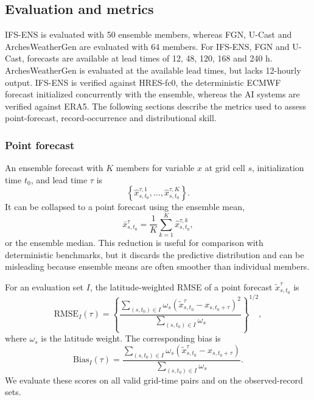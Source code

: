 \documentclass[11pt]{article}
\begin{document}
\subsection{Evaluation and metrics}

IFS-ENS is evaluated with 50 ensemble members, whereas FGN, U-Cast and ArchesWeatherGen are evaluated with 64 members. For IFS-ENS, FGN and U-Cast, forecasts are available at lead times of 12, 48, 120, 168 and 240 h. ArchesWeatherGen is evaluated at the available lead times, but lacks 12-hourly output. IFS-ENS is verified against HRES-fc0, the deterministic ECMWF forecast initialized concurrently with the ensemble, whereas the AI systems are verified against ERA5. The following sections describe the metrics used to assess point-forecast, record-occurrence and distributional skill. 

\subsubsection{Point forecast}

An ensemble forecast with $K$ members for variable $x$ at grid cell $s$, initialization time $t_0$, and lead time $\tau$ is
\begin{equation}
    \left\{\hat{x}^{\tau,1}_{s,t_0}, \ldots, \hat{x}^{\tau,K}_{s,t_0}\right\}.
\end{equation}
It can be collapsed to a point forecast using the ensemble mean,
\begin{equation}
    \bar{x}^{\tau}_{s,t_0} = \frac{1}{K}\sum_{k=1}^{K}\hat{x}^{\tau,k}_{s,t_0},
    \label{eq:ensmean}
\end{equation}
or the ensemble median. This reduction is useful for comparison with deterministic benchmarks, but it discards the predictive distribution and can be misleading because ensemble means are often smoother than individual members.

For an evaluation set $I$, the latitude-weighted RMSE of a point forecast $\tilde{x}^{\tau}_{s,t_0}$ is
\begin{equation}
    \mathrm{RMSE}_I(\tau) =
    \left\{
    \frac{\sum_{(s,t_0)\in I} \omega_s\left(\tilde{x}^{\tau}_{s,t_0} - x_{s,t_0+\tau}\right)^2}
    {\sum_{(s,t_0)\in I} \omega_s}
    \right\}^{1/2},
    \label{eq:rmse}
\end{equation}
where $\omega_s$ is the latitude weight. The corresponding bias is
\begin{equation}
    \mathrm{Bias}_I(\tau) =
    \frac{\sum_{(s,t_0)\in I} \omega_s\left(\tilde{x}^{\tau}_{s,t_0} - x_{s,t_0+\tau}\right)}
    {\sum_{(s,t_0)\in I} \omega_s}.
    \label{eq:bias}
\end{equation}
We evaluate these scores on all valid grid-time pairs and on the observed-record sets. 
\end{document}
